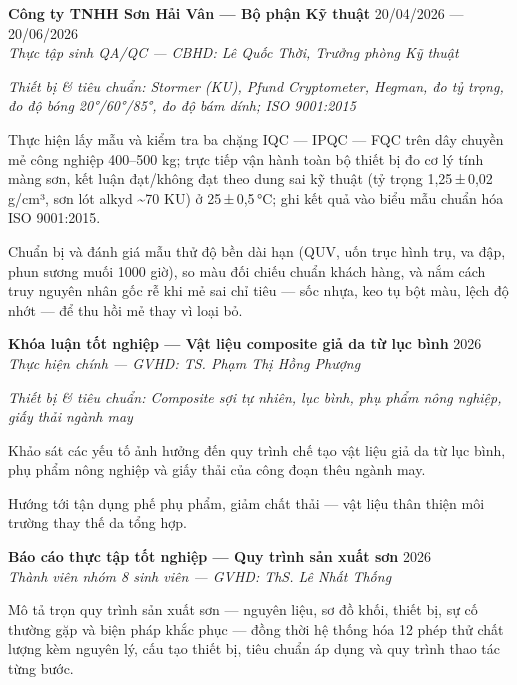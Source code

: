 \documentclass[10pt,a4paper]{article}
\newif\ifcvfirstsection\cvfirstsectiontrue
\renewcommand{\section}[1]{%
  \ifcvfirstsection\cvfirstsectionfalse\else\vspace{0pt plus 2.2fil}\fi
  \par\vspace{5pt}%
  \noindent{\large\bfseries\color{accentcolor}#1}\par
  \nointerlineskip\vspace{-1pt}%
  \noindent{\color{accentcolor}\rule{\linewidth}{0.8pt}}\par
  \nointerlineskip\vspace{2.5pt}%
}
\renewenvironment{itemize}
  {\begin{list}{{\color{accentcolor}\small\raisebox{0.1em}{$\bullet$}}}%
     {\setlength{\leftmargin}{1.1em}%
      \setlength{\itemindent}{0pt}%
      \setlength{\itemsep}{1pt plus 0.6fil}%
      \setlength{\parsep}{0pt}%
      \setlength{\topsep}{1pt plus 0.6fil}%
      \setlength{\listparindent}{0pt}}%
      \RaggedRight}
  {\end{list}}
\newcommand{\jobheader}[3]{
  \vspace{0pt plus 1fil}
  \textbf{#1} \hfill #2 \\
  \textit{#3}
}
\newcommand{\techstack}[1]{
  \par{\small\color{stackgray}\textit{Thiết bị \& tiêu chuẩn: #1}}
}
\begin{document}
\jobheader{Công ty TNHH Sơn Hải Vân --- Bộ phận Kỹ thuật}{20/04/2026 --- 20/06/2026}{Thực tập sinh QA/QC --- CBHD: Lê Quốc Thời, Trưởng phòng Kỹ thuật}
\techstack{Stormer (KU), Pfund Cryptometer, Hegman, đo tỷ trọng, đo độ bóng 20°/60°/85°, đo độ bám dính; ISO 9001:2015}
\begin{itemize}
  \item Thực hiện lấy mẫu và kiểm tra ba chặng IQC --- IPQC --- FQC trên dây chuyền mẻ công nghiệp 400--500 kg; trực tiếp vận hành toàn bộ thiết bị đo cơ lý tính màng sơn, kết luận đạt/không đạt theo dung sai kỹ thuật (tỷ trọng 1,25\,±\,0,02\,g/cm³, sơn lót alkyd \textasciitilde70 KU) ở 25\,±\,0,5\,°C; ghi kết quả vào biểu mẫu chuẩn hóa ISO 9001:2015.
  \item Chuẩn bị và đánh giá mẫu thử độ bền dài hạn (QUV, uốn trục hình trụ, va đập, phun sương muối 1000 giờ), so màu đối chiếu chuẩn khách hàng, và nắm cách truy nguyên nhân gốc rễ khi mẻ sai chỉ tiêu --- sốc nhựa, keo tụ bột màu, lệch độ nhớt --- để thu hồi mẻ thay vì loại bỏ.
\end{itemize}

\section{Nghiên cứu \& Dự án}

\jobheader{Khóa luận tốt nghiệp --- Vật liệu composite giả da từ lục bình}{2026}{Thực hiện chính --- GVHD: TS. Phạm Thị Hồng Phượng}
\techstack{Composite sợi tự nhiên, lục bình, phụ phẩm nông nghiệp, giấy thải ngành may}
\begin{itemize}
  \item Khảo sát các yếu tố ảnh hưởng đến quy trình chế tạo vật liệu giả da từ lục bình, phụ phẩm nông nghiệp và giấy thải của công đoạn thêu ngành may.
  \item Hướng tới tận dụng phế phụ phẩm, giảm chất thải --- vật liệu thân thiện môi trường thay thế da tổng hợp.
\end{itemize}

\jobheader{Báo cáo thực tập tốt nghiệp --- Quy trình sản xuất sơn}{2026}{Thành viên nhóm 8 sinh viên --- GVHD: ThS. Lê Nhất Thống}
\begin{itemize}
  \item Mô tả trọn quy trình sản xuất sơn --- nguyên liệu, sơ đồ khối, thiết bị, sự cố thường gặp và biện pháp khắc phục --- đồng thời hệ thống hóa 12 phép thử chất lượng kèm nguyên lý, cấu tạo thiết bị, tiêu chuẩn áp dụng và quy trình thao tác từng bước.
\end{itemize}
\end{document}
